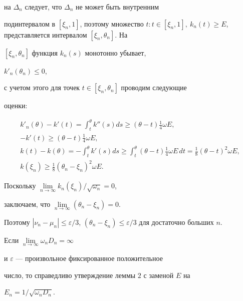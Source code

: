 \begin{pf}
на $\Delta_n$ следует, что $\Delta_n$ не может быть внутренним


подинтервалом в $[\xi_n,1]$, поэтому множество ${t: t \in[\xi_n,1],\ k_n


(t) \ge E}$, представляется интервалом $[\xi_n,\theta_n]$. На


$[\xi_n,\theta_n]$ функция $k_n(s)$ монотонно убывает,


$k'_n(\theta_n) \le 0$,


с учетом этого для точек $t \in [\xi_n,\theta_n]$ проводим следующие


оценки:


\begin{gather*}


k'_n(\theta)-{k}'(t)=\int_{t}^{\theta}{k}''(s)ds\ge(\theta-t)


\frac{1}{4} \omega E, \\


%


-{k}'(t) \ge (\theta -t) \frac{1}{4} \omega E, \\


%


k(t)-k(\theta)=-\int_{t}^{\theta}{k}'(s)ds\ge\int_{t}^{\theta}


(\theta -t) \frac{1}{4} \omega E\,dt=


\frac{1}{8} (\theta -t)^2 \omega E, \\


%


k(\xi_n) \ge \frac{1}{8} (\theta_n -\xi_n)^2 \omega E.


\end{gather*}


Поскольку $\lim\limits_{n\to \infty}k_n(\xi_n)/\sqrt {\omega_n}=0$,


заключаем, что $\lim\limits_{n\to \infty}(\theta_n-\xi_n)=0$.


Поэтому $|{\nu_n-\mu_n}| \le \varepsilon /3$, $(\theta_n -\xi_n) \le


\varepsilon /3$ для достаточно больших $n$.


\end{pf}





\begin{lem}


Если $\lim\limits_{n\to \infty}\omega_nD_n=\infty$


и $\varepsilon$ --- произвольное фиксированное положительное


число, то справедливо утверждение леммы $2$ с заменой $E$ на


$E_n=1/\sqrt {\omega_n D_n}$.


\end{lem}





